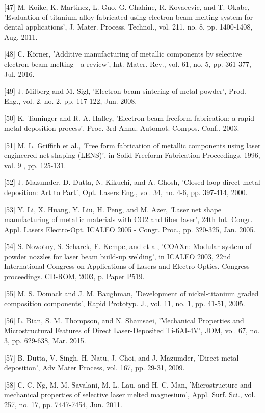 \documentclass[10pt]{article}
\begin{document}
[47] M. Koike, K. Martinez, L. Guo, G. Chahine, R. Kovacevic, and T. Okabe, 'Evaluation of titanium alloy fabricated using electron beam melting system for dental applications', J. Mater. Process. Technol., vol. 211, no. 8, pp. 1400-1408, Aug. 2011.

[48] C. Körner, 'Additive manufacturing of metallic components by selective electron beam melting - a review', Int. Mater. Rev., vol. 61, no. 5, pp. 361-377, Jul. 2016.

[49] J. Milberg and M. Sigl, 'Electron beam sintering of metal powder', Prod. Eng., vol. 2, no. 2, pp. 117-122, Jun. 2008.

[50] K. Taminger and R. A. Hafley, 'Electron beam freeform fabrication: a rapid metal deposition process', Proc. 3rd Annu. Automot. Compos. Conf., 2003.

[51] M. L. Griffith et al., 'Free form fabrication of metallic components using laser engineered net shaping (LENS)', in Solid Freeform Fabrication Proceedings, 1996, vol. 9 , pp. 125-131.

[52] J. Mazumder, D. Dutta, N. Kikuchi, and A. Ghosh, 'Closed loop direct metal deposition: Art to Part', Opt. Lasers Eng., vol. 34, no. 4-6, pp. 397-414, 2000.

[53] Y. Li, X. Huang, Y. Liu, H. Peng, and M. Azer, 'Laser net shape manufacturing of metallic materials with $\mathrm{CO} 2$ and fiber laser', 24th Int. Congr. Appl. Lasers Electro-Opt. ICALEO 2005 - Congr. Proc., pp. 320-325, Jan. 2005.

[54] S. Nowotny, S. Scharek, F. Kempe, and et al, 'COAXn: Modular system of powder nozzles for laser beam build-up welding', in ICALEO 2003, 22nd International Congress on Applications of Lasers and Electro Optics. Congress proceedings. CD-ROM, 2003, p. Paper P519.

[55] M. S. Domack and J. M. Baughman, 'Development of nickel-titanium graded composition components', Rapid Prototyp. J., vol. 11, no. 1, pp. 41-51, 2005.

[56] L. Bian, S. M. Thompson, and N. Shamsaei, 'Mechanical Properties and Microstructural Features of Direct Laser-Deposited Ti-6AI-4V', JOM, vol. 67, no. 3, pp. 629-638, Mar. 2015.

[57] B. Dutta, V. Singh, H. Natu, J. Choi, and J. Mazumder, 'Direct metal deposition', Adv Mater Process, vol. 167, pp. 29-31, 2009.

[58] C. C. Ng, M. M. Savalani, M. L. Lau, and H. C. Man, 'Microstructure and mechanical properties of selective laser melted magnesium', Appl. Surf. Sci., vol. 257, no. 17, pp. 7447-7454, Jun. 2011.
\end{document}
